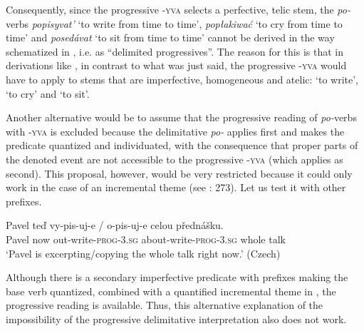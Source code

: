 \documentclass[output=paper,colorlinks,citecolor=brown]{langscibook}
\begin{document}
Consequently, since the progressive \textsc{-yva} selects a perfective, telic stem, the \textit{po-}verbs \textit{popisyvat'} ‘to write from time to time’, \textit{popłakiwać} ‘to cry from time to time’	and \textit{posedávat} ‘to sit from time to time’ cannot be derived in the way schematized in , i.e. as “delimited progressives”. The reason for this is that in derivations like , in contrast to what was just said, the progressive \textsc{-yva} would have to apply to stems that are imperfective, homogeneous and atelic: ‘to write’, ‘to cry’ and ‘to sit’.

\ea\label{biskup:ex:tricetdevet}
\z\z


\noindent Another alternative would be to assume that the progressive reading of \textit{po-}verbs with \textsc{-yva} is excluded because the delimitative \textit{po-} applies first and makes the predicate quantized and individuated, with the consequence that proper parts of the denoted event are not accessible to the progressive \textsc{-yva} (which applies as second). This proposal, however, would be very restricted because it could only work in the case of an incremental theme (see \citealt{Filip2005}: 273). Let us test it with other prefixes. 

\ea\label{biskup:ex:ctyricet}\gll Pavel teď vy-pis-uj-e / o-pis-uj-e celou přednášku.\\
Pavel now out-write-\textsc{prog-3.sg} {} about-write-\textsc{prog-3.sg} whole talk\\
\glt ‘Pavel is excerpting/copying the whole talk right now.’ \hfill (Czech)
\z

\noindent Although there is a secondary imperfective predicate with prefixes making the base verb quantized, combined with a quantified incremental theme in , the progressive reading is available. Thus, this alternative explanation of the impossibility of the progressive delimitative interpretation also does not work.
\end{document}
